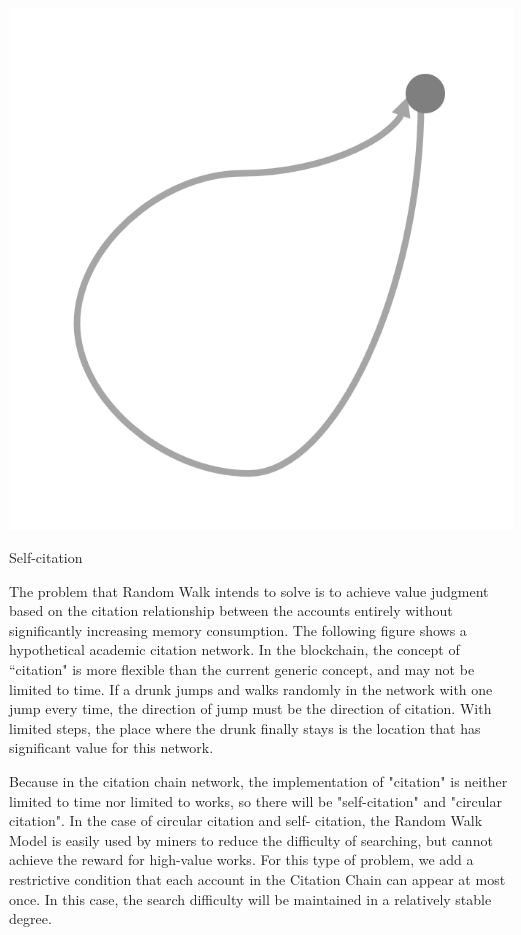 \documentclass[a4paper,oneside,openany]{tufte-book}
\begin{document}
\begin{marginfigure}
  \includegraphics[width=\textwidth]{fig/selfC.png}
  \caption{Self-citation}
\end{marginfigure}



The problem that Random Walk intends to solve is to achieve value judgment based on the citation relationship between the accounts entirely  without significantly increasing memory consumption. The following figure shows a hypothetical academic citation network. In the blockchain, the concept of “citation" is more flexible than the current generic concept, and may not be limited to time. If a drunk jumps and walks randomly in the network with one jump every time, the direction of jump must be the direction of citation. With limited steps, the place where the drunk finally stays is the location that has significant value for this network. 




Because in the citation chain network, the implementation of "citation" is neither limited to time nor limited to works, so there will be "self-citation" and "circular citation". In the case of circular citation and self- citation, the Random Walk Model is easily used by miners to reduce the difficulty of searching, but cannot achieve the reward for high-value works. For this type of problem, we add a restrictive condition that each account in the Citation Chain can appear at most once. In this case, the search difficulty will be maintained in a relatively stable degree.
\end{document}
